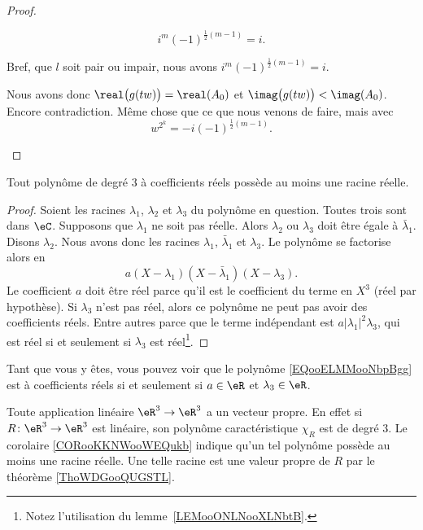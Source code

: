 \begin{proof}
\begin{subproof}
\begin{subproof}
\begin{subproof}
				\begin{equation}
					i^m(-1)^{\frac{ 1 }{2}(m-1)}=i.
				\end{equation}
			\end{subproof}
			Bref, que \( l\) soit pair ou impair, nous avons \( i^m(-1)^{\frac{ 1 }{2}(m-1)}=i\).
		\end{subproof}
		Nous avons donc \( \real\big( g(tw) \big)=\real(A_0)\) et \( \imag\big( g(tw) \big)<\imag(A_0)\). Encore contradiction.
		\spitem[Si \( \imag(A_0)=0\)]
		Même chose que ce que nous venons de faire, mais avec
		\begin{equation}
			w^{2^k}=-i(-1)^{\frac{ 1 }{2}(m-1)}.
		\end{equation}
	\end{subproof}
\end{proof}


\begin{corollary}       \label{CORooKKNWooWEQukb}
	Tout polynôme de degré \( 3\) à coefficients réels possède au moins une racine réelle.
\end{corollary}

\begin{proof}
	Soient les racines \( \lambda_1\), \( \lambda_2\) et \( \lambda_3\) du polynôme en question. Toutes trois sont dans \( \eC\). Supposons que \( \lambda_1\) ne soit pas réelle. Alors \( \lambda_2\) ou \( \lambda_3\) doit être égale à \( \bar\lambda_1\). Disons \( \lambda_2\). Nous avons donc les racines \( \lambda_1\), \( \bar\lambda_1\) et \( \lambda_3\). Le polynôme se factorise alors en
	\begin{equation}        \label{EQooELMMooNbpBgg}
		a(X-\lambda_1)(X-\bar\lambda_1)(X-\lambda_3).
	\end{equation}
	Le coefficient \( a\) doit être réel parce qu'il est le coefficient du terme en \( X^3\) (réel par hypothèse). Si \( \lambda_3\) n'est pas réel, alors ce polynôme ne peut pas avoir des coefficients réels. Entre autres parce que le terme indépendant est \( a| \lambda_1 |^2\lambda_3\), qui est réel si et seulement si \( \lambda_3\) est réel\footnote{Notez l'utilisation du lemme~\ref{LEMooONLNooXLNbtB}.}.
\end{proof}
Tant que vous y êtes, vous pouvez voir que le polynôme \eqref{EQooELMMooNbpBgg} est à coefficients réels si et seulement si \( a\in \eR\) et \( \lambda_3\in \eR\).

\begin{example}     \label{EXooIPLOooSNfiWg}
	Toute application linéaire \( \eR^3\to \eR^3\) a un vecteur propre. En effet si \( R\colon \eR^3\to \eR^3\) est linéaire, son polynôme caractéristique \( \chi_R\) est de degré \( 3\). Le corolaire \ref{CORooKKNWooWEQukb} indique qu'un tel polynôme possède au moins une racine réelle.
	Une telle racine est une valeur propre de \( R\) par le théorème \ref{ThoWDGooQUGSTL}.
\end{example}

